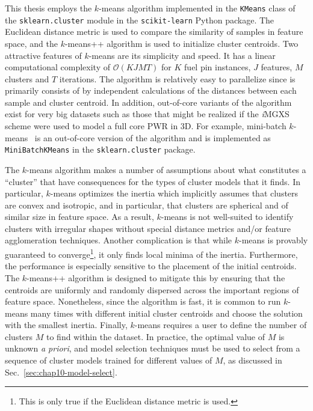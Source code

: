 This thesis employs the $k$-means algorithm implemented in the \texttt{KMeans} class of the \texttt{sklearn.cluster} module in the \texttt{scikit-learn} Python package. The Euclidean distance metric is used to compare the similarity of samples in feature space, and the $k$-means++ algorithm is used to initialize cluster centroids. Two attractive features of $k$-means are its simplicity and speed. It has a linear computational complexity of $\mathcal{O}(KJMT)$ for $K$ fuel pin instances, $J$ features, $M$ clusters and $T$ iterations. The algorithm is relatively easy to parallelize since is primarily consists of by independent calculations of the distances between each sample and cluster centroid. In addition, out-of-core variants of the algorithm exist for very big datasets such as those that might be realized if the \textit{i}\ac{MGXS} scheme were used to model a full core \ac{PWR} in 3D. For example, mini-batch $k$-means~\cite{sculley2010minibatchkmeans} is an out-of-core version of the algorithm and is implemented as \texttt{MiniBatchKMeans} in the \texttt{sklearn.cluster} package.

The $k$-means algorithm makes a number of assumptions about what constitutes a ``cluster'' that have consequences for the types of cluster models that it finds. In particular, $k$-means optimizes the inertia which implicitly assumes that clusters are convex and isotropic, and in particular, that clusters are spherical and of similar size in feature space. As a result, $k$-means is not well-suited to identify clusters with irregular shapes without special distance metrics and/or feature agglomeration techniques. Another complication is that while $k$-means is provably guaranteed to converge\footnote{This is only true if the Euclidean distance metric is used.}, it only finds local minima of the inertia. Furthermore, the performance is especially sensitive to the placement of the initial centroids. The $k$-means++ algorithm is designed to mitigate this by ensuring that the centroids are uniformly and randomly dispersed across the important regions of feature space. Nonetheless, since the algorithm is fast, it is common to run $k$-means many times with different initial cluster centroids and choose the solution with the smallest inertia. Finally, $k$-means requires a user to define the number of clusters $M$ to find within the dataset. In practice, the optimal value of $M$ is unknown \textit{a priori}, and model selection techniques must be used to select from a sequence of cluster models trained for different values of $M$, as discussed in Sec.~\ref{sec:chap10-model-select}.

